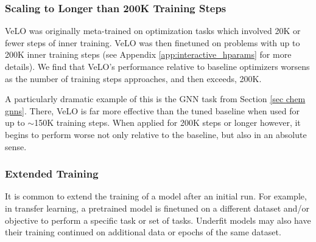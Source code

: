 \documentclass[11pt]{article}
\begin{document}
\subsubsection{Scaling to Longer than 200K Training Steps}
\label{sec long training failure}

VeLO was originally meta-trained on optimization tasks which involved 20K or fewer steps of inner training. VeLO was then finetuned on problems with up to 200K inner training steps (see Appendix \ref{app:interactive_hparams} for more details). 
We find that VeLO's performance relative to baseline optimizers worsens as the number of training steps approaches, and then exceeds, 200K.

A particularly dramatic example of this is the GNN task from Section \ref{sec chem gnns}. There, VeLO is far more effective than the tuned baseline when used for up to $\sim$150K training steps. When applied for 200K steps or longer however, it begins to perform worse not only relative to the baseline, but also in an absolute sense. 

\subsubsection{Extended Training}

It is common to extend the training of a model after an initial run. For example, in transfer learning, a pretrained model is finetuned on a different dataset and/or objective to perform a specific task or set of tasks. Underfit models may also have their training continued on additional data or epochs of the same dataset.
\end{document}
